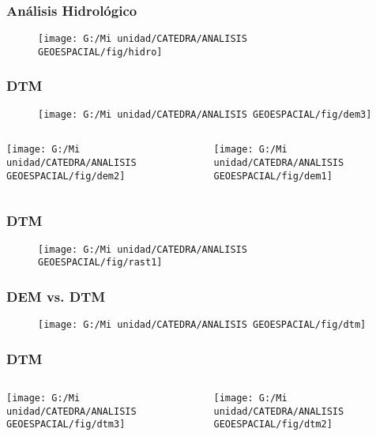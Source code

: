 \documentclass[14pt]{beamer}
\begin{document}
\begin{frame}
\frametitle{Análisis Hidrológico}
  \begin{figure}
    \centering
    \texttt{[image: G:/Mi unidad/CATEDRA/ANALISIS GEOESPACIAL/fig/hidro]}
  \end{figure}
\end{frame}
\begin{frame}
\frametitle{DTM}
  \begin{figure}
    \centering
    \texttt{[image: G:/Mi unidad/CATEDRA/ANALISIS GEOESPACIAL/fig/dem3]}
   \end{figure}
\begin{columns}
		\begin{column}{.49\linewidth}
		 \texttt{[image: G:/Mi unidad/CATEDRA/ANALISIS GEOESPACIAL/fig/dem2]}
		\end{column}
		\begin{column}{.49\linewidth}
			 \texttt{[image: G:/Mi unidad/CATEDRA/ANALISIS GEOESPACIAL/fig/dem1]}
		\end{column}
	\end{columns}
\end{frame}
\begin{frame}
\frametitle{DTM}
  \begin{figure}
    \centering
    \texttt{[image: G:/Mi unidad/CATEDRA/ANALISIS GEOESPACIAL/fig/rast1]}
  \end{figure}
\end{frame}
\begin{frame}
\frametitle{DEM vs. DTM}
  \begin{figure}
    \centering
    \texttt{[image: G:/Mi unidad/CATEDRA/ANALISIS GEOESPACIAL/fig/dtm]}
  \end{figure}
\end{frame}
\begin{frame}
\frametitle{DTM}
\begin{columns}
		\begin{column}{.30\linewidth}
		 \texttt{[image: G:/Mi unidad/CATEDRA/ANALISIS GEOESPACIAL/fig/dtm3]}
		\end{column}
		\begin{column}{.70\linewidth}
			 \texttt{[image: G:/Mi unidad/CATEDRA/ANALISIS GEOESPACIAL/fig/dtm2]}
		\end{column}
	\end{columns}
\end{frame}
\end{document}

